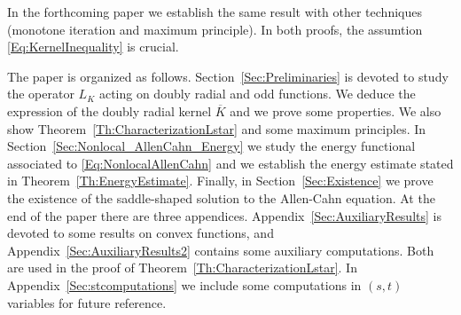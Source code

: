 In the forthcoming paper \cite{FelipeSanz-Perela:IntegroDifferentialII} we establish the same result with other techniques (monotone iteration and maximum principle). In both proofs, the assumtion \eqref{Eq:KernelInequality} is crucial.


The paper is organized as follows. Section~\ref{Sec:Preliminaries} is devoted to study the operator $L_K$ acting on doubly radial and odd functions. We deduce the expression of the doubly radial kernel $\overline{K}$ and we prove some properties. We also show Theorem~\ref{Th:CharacterizationLstar} and some maximum principles. In Section~\ref{Sec:Nonlocal_AllenCahn_Energy} we study the energy functional associated to \eqref{Eq:NonlocalAllenCahn} and we establish the energy estimate stated in Theorem~\ref{Th:EnergyEstimate}. Finally, in Section~\ref{Sec:Existence} we prove the existence of the saddle-shaped solution to the Allen-Cahn equation. At the end of the paper there are three appendices. Appendix~\ref{Sec:AuxiliaryResults} is devoted to some results on convex functions, and Appendix~\ref{Sec:AuxiliaryResults2} contains some auxiliary computations. Both are used in the proof of Theorem~\ref{Th:CharacterizationLstar}. In Appendix~\ref{Sec:stcomputations} we include some computations in $(s,t)$ variables for future reference.